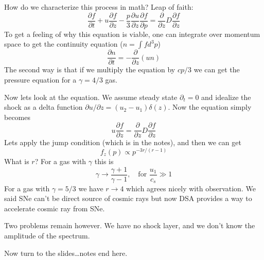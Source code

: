 \documentclass[letterpaper, 11pt]{article}
\numberwithin{equation}{section}
\numberwithin{figure}{section}
\begin{document}
How do we characterize this process in math? Leap of faith:
\begin{equation}
  \label{eq:24}
  \frac{\partial f}{\partial t} + u\frac{\partial f}{\partial z} - \frac{p}{3}\frac{\partial u}{\partial z}\frac{\partial f}{\partial p} = \frac{\partial}{\partial z}D\frac{\partial f}{\partial z}
\end{equation}
To get a feeling of why this equation is viable, one can integrate over momentum
space to get the continuity equation ($n = \int f d^3p$)
\begin{equation}
  \label{eq:25}
  \frac{\partial n}{\partial t} = -\frac{\partial}{\partial z}(u n)
\end{equation}
The second way is that if we multiply the equation by $cp/3$ we can get the
pressure equation for a $\gamma = 4/3$ gas.

Now lets look at the equation. We assume steady state $\partial_t = 0$ and
idealize the shock as a delta function $\partial u/\partial z = (u_2 -
u_1)\delta(z)$. Now the equation simply becomes
\begin{equation}
  \label{eq:26}
  u\frac{\partial f}{\partial z} = \frac{\partial}{\partial z}D\frac{\partial f}{\partial z}
\end{equation}
Lets apply the jump condition (which is in the notes), and then we can get
\begin{equation}
  \label{eq:27}
  f_z(p) \propto p^{-3r/(r - 1)}
\end{equation}
What is $r$? For a gas with $\gamma$ this is
\begin{equation}
  \label{eq:28}
  \gamma \to \frac{\gamma + 1}{\gamma - 1},\quad \text{for } \frac{u_1}{c_s} \gg 1
\end{equation}
For a gas with $\gamma = 5/3$ we have $r \to 4$ which agrees nicely with
observation. We said SNe can't be direct source of cosmic rays but now DSA
provides a way to accelerate cosmic ray from SNe.

Two problems remain however. We have no shock layer, and we don't know the amplitude of
the spectrum.

Now turn to the slides\dots notes end here.
\end{document}
